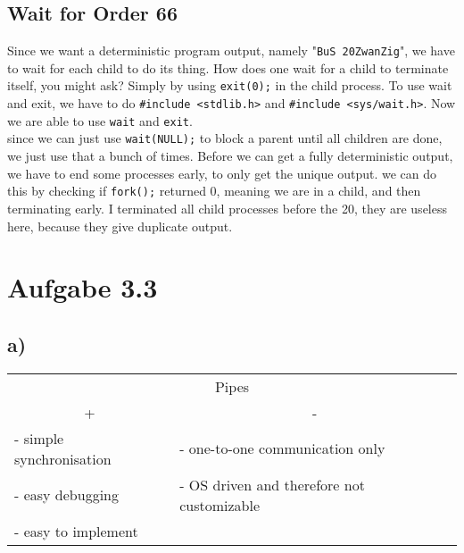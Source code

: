 \documentclass[a4paper, 11pt]{article}
\begin{document}
    \subsection{Wait for Order 66}
    Since we want a deterministic program output, namely "\texttt{BuS 20ZwanZig}", we have to wait for each child to do its thing.
    How does one wait for a child to terminate itself, you might ask? Simply by using \lstinline{exit(0);} in the child process. 
    To use wait and exit, we have to do \lstinline{#include <stdlib.h>} and \lstinline{#include <sys/wait.h>}.
    Now we are able to use \lstinline{wait} and \lstinline{exit}.\\
    since we can just use \lstinline{wait(NULL);} to block a parent until all children are done, we just use that a bunch of times.
    Before we can get a fully deterministic output, we have to end some processes early, to only get the unique output. we can do 
    this by checking if \lstinline{fork();} returned 0, meaning we are in a child, and then terminating early. I terminated all child
    processes before the 20, they are useless here, because they give duplicate output.  
    \newpage

    \section*{Aufgabe 3.3}
        \subsection*{a)}
\begin{table}[h]
    \begin{tabular}{@{}llll@{}}
    \multicolumn{4}{c}{Pipes}                                                                                      \\
    \multicolumn{2}{c}{+}                         & \multicolumn{2}{c}{-}                                          \\ \midrule
    \multicolumn{2}{l|}{- simple synchronisation} & \multicolumn{2}{l}{- one-to-one communication only}            \\
    \multicolumn{2}{l|}{- easy debugging}         & \multicolumn{2}{l}{- OS driven and therefore not customizable} \\
    \multicolumn{2}{l|}{- easy to implement}      & \multicolumn{2}{l}{}                                          
    \end{tabular}
    \end{table}
\end{document}
